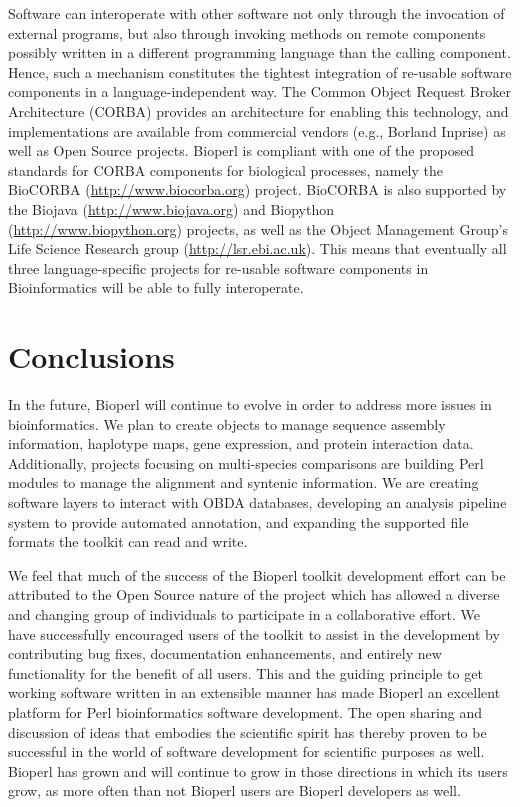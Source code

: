 \documentclass[12pt]{article}
\begin{document}
Software can interoperate with other software not only through the
invocation of external programs, but also through invoking methods on
remote components possibly written in a different programming language
than the calling component.  Hence, such a mechanism constitutes the
tightest integration of re-usable software components in a
language-independent way. The Common Object Request Broker
Architecture (CORBA) provides an architecture for enabling this
technology, and implementations are available from commercial vendors
(e.g., Borland Inprise) as well as Open Source projects. Bioperl is
compliant with one of the proposed standards for CORBA components for
biological processes, namely the BioCORBA
(\url{http://www.biocorba.org}) project.  BioCORBA is also supported
by the Biojava (\url{http://www.biojava.org}) and Biopython
(\url{http://www.biopython.org}) projects, as well as the Object
Management Group's Life Science Research group
(\url{http://lsr.ebi.ac.uk}). This means that eventually all three
language-specific projects for re-usable software components in
Bioinformatics will be able to fully interoperate.

\section{Conclusions}

In the future, Bioperl will continue to evolve in order to address
more issues in bioinformatics.  We plan to create objects to manage
sequence assembly information, haplotype maps, gene expression, and
protein interaction data.  Additionally, projects focusing on
multi-species comparisons are building Perl modules to manage the
alignment and syntenic information.  We are creating software layers
to interact with OBDA databases, developing an analysis pipeline
system to provide automated annotation, and expanding the supported
file formats the toolkit can read and write.

We feel that much of the success of the Bioperl toolkit development
effort can be attributed to the Open Source nature of the
project which
has allowed a diverse and changing group of individuals to participate
in a collaborative effort.  We have successfully encouraged users of
the toolkit to assist in the development by contributing bug fixes,
documentation enhancements, and entirely new functionality for the
benefit of all users.  This and the guiding principle to get working
software written in an extensible manner has made Bioperl an excellent
platform for Perl bioinformatics software development.  The open
sharing and discussion of ideas that embodies the scientific spirit
has thereby proven to be successful in the world of software
development for scientific purposes as well.  Bioperl has grown and
will continue to grow in those directions in which its users grow, as
more often than not Bioperl users are Bioperl developers as well.
\end{document}
